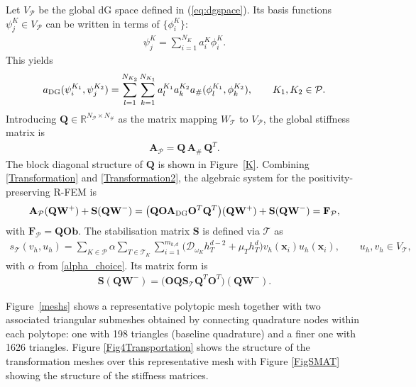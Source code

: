 \documentclass[11pt,final]{amsart}
\theoremstyle{plain}
\theoremstyle{definition}
\newcommand\calP{{\mathcal{P}}}
\newcommand\calT{{\mathcal{T}}}
\newcommand{\mesh}{\calP}
\renewcommand{\k}{K}
\begin{document}
Let $V_{\calP}$ be the global dG space defined in
(\ref{eq:dgspace}). Its basis functions $\psi_{j}^{K}\in V_{\calP}$
can be written in terms of $\{\phi_{i}^{K}\}$:
\begin{align}
  \psi_{j}^{K}=\sum_{i=1}^{N_{K}}a_{i}^{K}\phi_{i}^{K}. \label{Projection11}
\end{align}
This yields
\begin{align}
  a_{\rm DG}(\psi_{i}^{K_{1}},\psi_{j}^{K_{2}})
  = \sum_{l=1}^{N_{K_{2}}}\sum_{k=1}^{N_{K_{1}}}a_{l}^{K_{1}}a_{k}^{K_{2}}
  a_{\#}(\phi_{l}^{K_{1}},\phi_{k}^{K_{2}}), 
  \qquad K_{1},K_{2}\in \calP. \label{Transformation23}
\end{align}
Introducing
$\mathbf{Q}\in\mathbb{R}^{N_{\calP}\times N_{\#}}$ as the matrix
mapping $W_\calT$ to $V_\calP$, the global stiffness matrix is
\begin{align}
  \mathbf{A}_{\calP}=\mathbf{Q}\,\mathbf{A}_{\#}\,\mathbf{Q}^{T}. \label{Transformation2}
\end{align}
The block diagonal structure of $\mathbf{Q}$ is shown in
Figure~\ref{K}. Combining \eqref{Transformation} and
\eqref{Transformation2}, the algebraic system for the positivity-preserving R-FEM is
\begin{align}
  \mathbf{A}_{\calP}(\mathbf{Q}\mathbf{W}^{+}) + \mathbf{S}(\mathbf{Q} \mathbf{W}^{-})
  = \bigl(\mathbf{Q}\mathbf{O}\mathbf{A}_{\rm DG}\mathbf{O}^{T}\mathbf{Q}^{T}\bigr)(\mathbf{Q}\mathbf{W}^{+})
  + \mathbf{S}(\mathbf{Q}\mathbf{W}^{-})
  =  \mathbf{F}_\calP, \label{R-FEM_Algebric}
\end{align}
with $\mathbf{F}_\calP= \mathbf{Q}\mathbf{O}\mathbf{b}$. The
stabilisation matrix $\mathbf{S}$ is defined via $\calT$ as
\begin{align*}
  s_{\calT}(v_h,u_h)=\sum_{\k\in\mesh}\alpha\sum_{T\in\calT_\k}\sum_{i=1}^{m_{k,d}}
  \big(\mathcal{D}_{\omega_\k} h_T^{d-2}+\mu_T h_T^{d} \big)v_{h}(\boldsymbol{x}_{i})u_{h}(\boldsymbol{x}_{i}), 
  \qquad u_{h},v_{h}\in V_{\calT},
\end{align*}
with $\alpha$ from \eqref{alpha_choice}. Its matrix form is
\begin{align*}
  \mathbf{S}(\mathbf{Q} \mathbf{W}^{-})=
  \bigl(\mathbf{O}\mathbf{Q}\mathbf{S}_{\calT}\mathbf{Q}^{T}\mathbf{O}^{T}\bigr)(\mathbf{Q}\mathbf{W}^{-}).
\end{align*}

Figure~\ref{meshs} shows a representative polytopic mesh together with
two associated triangular submeshes obtained by connecting quadrature
nodes within each polytope: one with 198 triangles (baseline
quadrature) and a finer one with 1626 triangles. Figure
\ref{Fig4Transportation} shows the structure of the transformation
meshes over this representative mesh with Figure \ref{FigSMAT} showing
the structure of the stiffness matrices.
\end{document}
